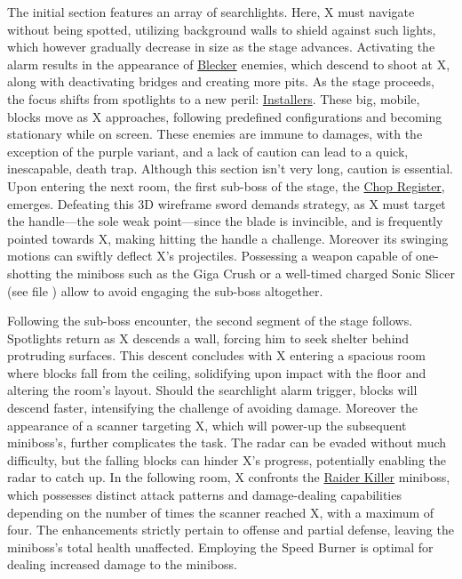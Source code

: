 The initial section features an array of searchlights. Here, X must navigate without being spotted, utilizing background walls to shield against such lights, which however gradually decrease in size as the stage advances. Activating the alarm results in the appearance of \hyperlink{enem:Blecker}{Blecker} enemies, which descend to shoot at X, along with deactivating bridges and creating more pits. As the stage proceeds, the focus shifts from spotlights to a new peril: \hyperlink{enem:Installer}{Installers}. These big, mobile, blocks move as X approaches, following predefined configurations and becoming stationary while on screen. These enemies are immune to damages, with the exception of the purple variant, and a lack of caution can lead to a quick, inescapable, death trap. Although this section isn't very long, caution is essential. Upon entering the next room, the first sub-boss of the stage, the \hyperlink{miniboss:Chop_Register}{Chop Register}, emerges. Defeating this 3D wireframe sword demands strategy, as X must target the handle—the sole weak point—since the blade is invincible, and is frequently pointed towards X, making hitting the handle a challenge. Moreover its swinging motions can swiftly deflect X's projectiles. Possessing a weapon capable of one-shotting the miniboss such as the Giga Crush or a well-timed charged Sonic Slicer (see file  ) allow to avoid engaging the sub-boss altogether.

Following the sub-boss encounter, the second segment of the stage follows. Spotlights return as X descends a wall, forcing him to seek shelter behind protruding surfaces. This descent concludes with X entering a spacious room where blocks fall from the ceiling, solidifying upon impact with the floor and altering the room's layout. Should the searchlight alarm trigger, blocks will descend faster, intensifying the challenge of avoiding damage. Moreover the appearance of a scanner targeting X, which will power-up the subsequent miniboss's, further complicates the task. The radar can be evaded without much difficulty, but the falling blocks can hinder X's progress, potentially enabling the radar to catch up. In the following room, X confronts the \hyperlink{miniboss:Raider_Killer}{Raider Killer} miniboss, which possesses distinct attack patterns and damage-dealing capabilities depending on the number of times the scanner reached X, with a maximum of four. The enhancements strictly pertain to offense and partial defense, leaving the miniboss's total health unaffected. Employing the Speed Burner is optimal for dealing increased damage to the miniboss.

